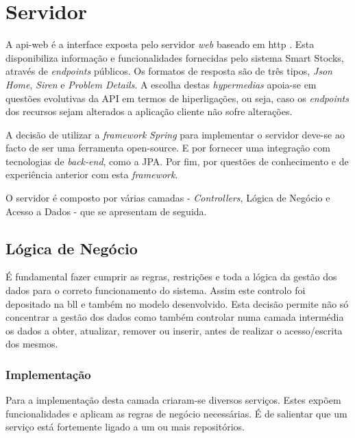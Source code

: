 \section{Servidor}\label{sec42}

A \gls{api-web} é a interface exposta pelo servidor \textit{web} baseado em \acrfull{http} \cite{RFC7231:http}. Esta disponibiliza informação e funcionalidades fornecidas pelo sistema Smart Stocks, através de \textit{endpoints} públicos. Os formatos de resposta são de três tipos, \textit{Json Home}, \textit{Siren} e \textit{Problem Details}. A escolha destas \textit{hypermedias} apoia-se em questões evolutivas da API em termos de hiperligações, ou seja, caso os \textit{endpoints} dos recursos sejam alterados a aplicação cliente não sofre alterações.

A decisão de utilizar a \textit{framework} \textit{Spring} para implementar o servidor deve-se ao facto de ser uma ferramenta \gls{open-source}. E por fornecer uma integração com tecnologias de \textit{back-end}, como a JPA. Por fim, por questões de conhecimento e de experiência anterior com esta \textit{framework}. 

O servidor é composto por várias camadas - \textit{Controllers}, Lógica de Negócio e Acesso a Dados - que se apresentam de seguida.

%
%
\subsection{Lógica de Negócio}\label{subsec421}

É fundamental fazer cumprir as regras, restrições e toda a lógica da gestão dos dados para o correto funcionamento do sistema. Assim  este controlo foi depositado na \acrfull{bll} e também no modelo desenvolvido. Esta decisão permite não só concentrar a gestão dos dados como também controlar numa camada intermédia os dados a obter, atualizar, remover ou inserir, antes de realizar o acesso/escrita dos mesmos. 

\subsubsection{Implementação}\label{subsubsec4211}

Para a implementação desta camada criaram-se diversos serviços. Estes expõem funcionalidades e aplicam as regras de negócio necessárias. É de salientar que um serviço está fortemente ligado a um ou mais repositórios. 

